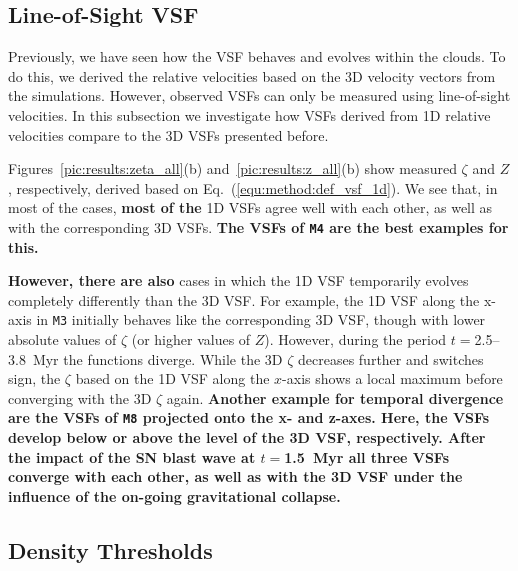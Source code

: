 \subsection{Line-of-Sight VSF}\label{results:1d}

Previously, we have seen how the VSF behaves and evolves within the clouds.
To do this, we derived the relative velocities based on the 3D velocity vectors from the simulations.
However, observed VSFs can only be measured using line-of-sight velocities.
In this subsection we investigate how VSFs derived from 1D relative velocities compare to the 3D VSFs presented before.

Figures~\ref{pic:results:zeta_all}(b) and~\ref{pic:results:z_all}(b) show measured $\zeta$ and $Z$, respectively, derived based on Eq.~(\ref{equ:method:def_vsf_1d}). 
We see that, in most of the cases, \textbf{most of the} 1D VSFs agree well with each other, as well as with the corresponding 3D VSFs.
\textbf{
	The VSFs of \texttt{M4} are the best examples for this.
}

\textbf{However, there are also} cases in which the 1D VSF temporarily evolves completely differently than the 3D VSF.
For example, the 1D VSF along the x-axis in \texttt{M3} initially behaves like the corresponding 3D VSF, though with lower absolute values of $\zeta$ (or higher values of $Z$).
However, during the period $t=$2.5--3.8~Myr the functions diverge. 
While the 3D $\zeta$ decreases further and switches sign, the $\zeta$ based on the 1D VSF along the $x$-axis shows a local maximum before converging with the 3D $\zeta$ again. 
\textbf{
Another example for temporal divergence are the VSFs of \texttt{M8} projected onto the x- and z-axes. 
Here, the VSFs develop below or above the level of the 3D VSF, respectively.
After the impact of the SN blast wave at $t=$1.5~Myr all three VSFs converge with each other, as well as with the 3D VSF under the influence of the on-going gravitational collapse.
}



\subsection{Density Thresholds}\label{results:densthres}

